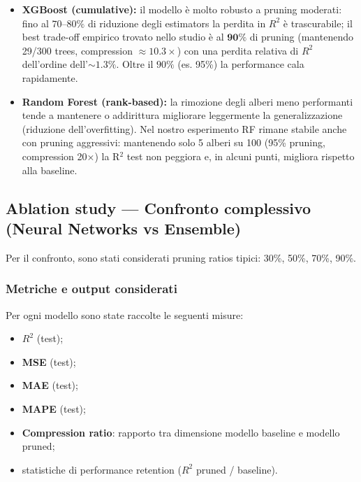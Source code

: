 \documentclass[a4paper,12pt]{report}
\begin{document}
	\begin{itemize}
		\item \textbf{XGBoost (cumulative):} il modello è molto robusto a pruning moderati: fino al \(70\text{--}80\%\) di riduzione degli estimators la perdita in \(R^2\) è trascurabile; il best trade-off empirico trovato nello studio è al \(\mathbf{90\%}\) di pruning (mantenendo 29/300 trees, compression \(\approx 10.3\times\)) con una perdita relativa di \(R^2\) dell'ordine dell'\(\sim 1.3\%\). Oltre il \(90\%\) (es. 95\%) la performance cala rapidamente.
		\item \textbf{Random Forest (rank-based):} la rimozione degli alberi meno performanti tende a mantenere o addirittura migliorare leggermente la generalizzazione (riduzione dell'overfitting). Nel nostro esperimento RF rimane stabile anche con pruning aggressivi: mantenendo solo 5 alberi su 100 (95\% pruning, compression 20×) la R\(^2\) test non peggiora e, in alcuni punti, migliora rispetto alla baseline.
	\end{itemize}
	
	\subsection{Ablation study — Confronto complessivo (Neural Networks vs Ensemble)}
	Per il confronto, sono stati considerati pruning ratios tipici: 30\%, 50\%, 70\%, 90\%.  
	
	\subsubsection{Metriche e output considerati}
	Per ogni modello sono state raccolte le seguenti misure:
	\begin{itemize}
		\item \textbf{\(R^2\)} (test);
		\item \textbf{MSE} (test);
		\item \textbf{MAE} (test);
		\item \textbf{MAPE} (test);
		\item \textbf{Compression ratio}: rapporto tra dimensione modello baseline e modello pruned;
		\item statistiche di performance retention (\(R^2\) pruned / baseline).
	\end{itemize}
	
\end{document}
